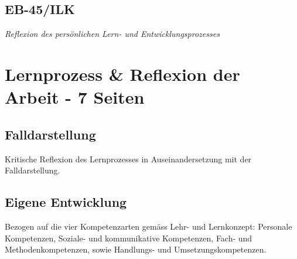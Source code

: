 \subsection{EB-45/ILK}

\textit{Reflexion des persönlichen Lern- und Entwicklungsprozesses}

\section{Lernprozess \& Reflexion der Arbeit - 7 Seiten}\label{Reflexion}
\subsection{Falldarstellung} Kritische Reflexion des Lernprozesses in Auseinandersetzung mit der Falldarstellung.
\subsection{Eigene Entwicklung} Bezogen auf die vier Kompetenzarten gemäss Lehr- und Lernkonzept: Personale Kompetenzen, Soziale- und kommunikative Kompetenzen, Fach- und Methodenkompetenzen, sowie Handlungs- und Umsetzungskompetenzen.
